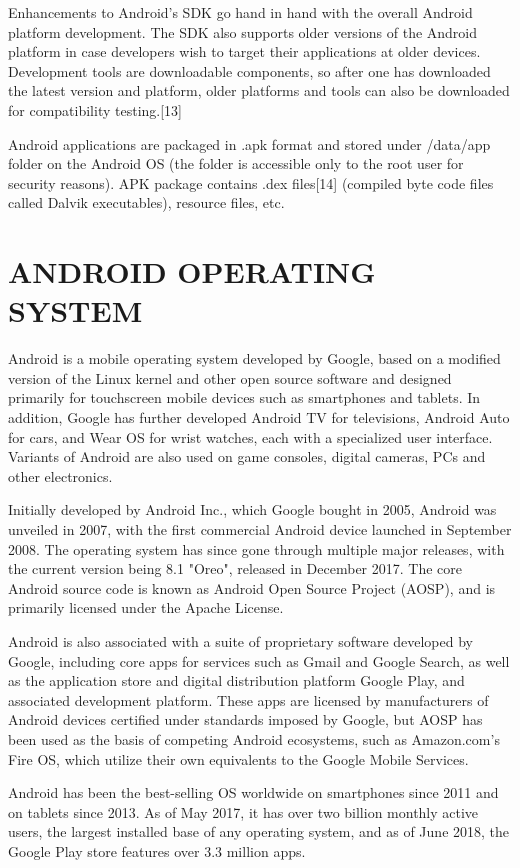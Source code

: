 \documentclass{fisatproject}
\begin{document}
Enhancements to Android's SDK go hand in hand with the overall Android platform development. The SDK also supports older versions of the Android platform in case developers wish to target their applications at older devices. Development tools are downloadable components, so after one has downloaded the latest version and platform, older platforms and tools can also be downloaded for compatibility testing.[13]

Android applications are packaged in .apk format and stored under /data/app folder on the Android OS (the folder is accessible only to the root user for security reasons). APK package contains .dex files[14] (compiled byte code files called Dalvik executables), resource files, etc.

\chapter{ANDROID OPERATING SYSTEM}

Android is a mobile operating system developed by Google, based on a modified version of the Linux kernel and other open source software and designed primarily for touchscreen mobile devices such as smartphones and tablets. In addition, Google has further developed Android TV for televisions, Android Auto for cars, and Wear OS for wrist watches, each with a specialized user interface. Variants of Android are also used on game consoles, digital cameras, PCs and other electronics.

Initially developed by Android Inc., which Google bought in 2005, Android was unveiled in 2007, with the first commercial Android device launched in September 2008. The operating system has since gone through multiple major releases, with the current version being 8.1 "Oreo", released in December 2017. The core Android source code is known as Android Open Source Project (AOSP), and is primarily licensed under the Apache License.

Android is also associated with a suite of proprietary software developed by Google, including core apps for services such as Gmail and Google Search, as well as the application store and digital distribution platform Google Play, and associated development platform. These apps are licensed by manufacturers of Android devices certified under standards imposed by Google, but AOSP has been used as the basis of competing Android ecosystems, such as Amazon.com's Fire OS, which utilize their own equivalents to the Google Mobile Services.

Android has been the best-selling OS worldwide on smartphones since 2011 and on tablets since 2013. As of May 2017, it has over two billion monthly active users, the largest installed base of any operating system, and as of June 2018, the Google Play store features over 3.3 million apps.
\end{document}
